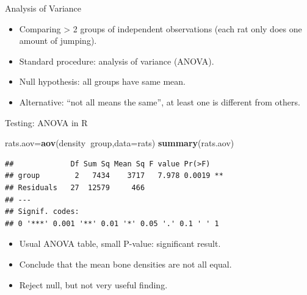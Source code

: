 \documentclass[ignorenonframetext,]{beamer}
\newenvironment{Shaded}{\begin{snugshade}}{\end{snugshade}}
\newcommand{\DataTypeTok}[1]{\textcolor[rgb]{0.13,0.29,0.53}{#1}}
\newcommand{\KeywordTok}[1]{\textcolor[rgb]{0.13,0.29,0.53}{\textbf{#1}}}
\newcommand{\NormalTok}[1]{#1}
\newcommand{\OperatorTok}[1]{\textcolor[rgb]{0.81,0.36,0.00}{\textbf{#1}}}
\providecommand{\tightlist}{%
  \setlength{\itemsep}{0pt}\setlength{\parskip}{0pt}}
\begin{document}
\begin{frame}{Analysis of Variance}
\protect\hypertarget{analysis-of-variance}{}

\begin{itemize}
\tightlist
\item
  Comparing \textgreater{} 2 groups of independent observations (each
  rat only does one amount of jumping).
\item
  Standard procedure: analysis of variance (ANOVA).
\item
  Null hypothesis: all groups have same mean.
\item
  Alternative: ``not all means the same'', at least one is different
  from others.
\end{itemize}

\end{frame}

\begin{frame}[fragile]{Testing: ANOVA in R}
\protect\hypertarget{testing-anova-in-r}{}

\begin{Shaded}
\begin{Highlighting}[]
\NormalTok{rats.aov=}\KeywordTok{aov}\NormalTok{(density}\OperatorTok{~}\NormalTok{group,}\DataTypeTok{data=}\NormalTok{rats)}
\KeywordTok{summary}\NormalTok{(rats.aov)}
\end{Highlighting}
\end{Shaded}

\begin{verbatim}
##             Df Sum Sq Mean Sq F value Pr(>F)   
## group        2   7434    3717   7.978 0.0019 **
## Residuals   27  12579     466                  
## ---
## Signif. codes:  
## 0 '***' 0.001 '**' 0.01 '*' 0.05 '.' 0.1 ' ' 1
\end{verbatim}

\begin{itemize}
\tightlist
\item
  Usual ANOVA table, small P-value: significant result.
\item
  Conclude that the mean bone densities are not all equal.
\item
  Reject null, but not very useful finding.
\end{itemize}

\end{frame}
\end{document}
